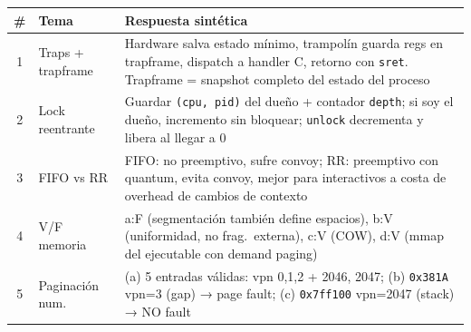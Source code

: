 \documentclass[11pt,a4paper]{article}
\begin{document}
\begin{center}
\small
\begin{tabular}{@{}clp{9cm}@{}}
\toprule
\# & Tema & Respuesta sintética \\
\midrule
1 & Traps + trapframe & Hardware salva estado mínimo, trampolín guarda regs en trapframe, dispatch a handler C, retorno con \texttt{sret}. Trapframe = snapshot completo del estado del proceso \\
2 & Lock reentrante  & Guardar \texttt{(cpu, pid)} del dueño + contador \texttt{depth}; si soy el dueño, incremento sin bloquear; \texttt{unlock} decrementa y libera al llegar a $0$ \\
3 & FIFO vs RR       & FIFO: no preemptivo, sufre convoy; RR: preemptivo con quantum, evita convoy, mejor para interactivos a costa de overhead de cambios de contexto \\
4 & V/F memoria      & a:F (segmentación también define espacios), b:V (uniformidad, no frag.\ externa), c:V (COW), d:V (mmap del ejecutable con demand paging) \\
5 & Paginación num.  & (a) 5 entradas válidas: vpn 0,1,2 + 2046, 2047; (b) \texttt{0x381A} vpn=3 (gap) → page fault; (c) \texttt{0x7ff100} vpn=2047 (stack) → NO fault \\
\bottomrule
\end{tabular}
\end{center}
\end{document}
